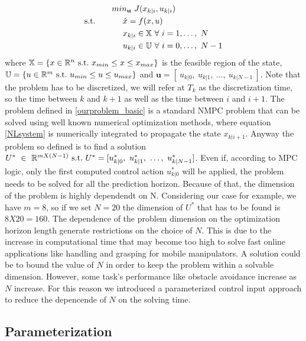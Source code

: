 \begin{equation} \label{ourproblem_basic}
\begin{split}
		& min_{\textbf{u}}\ J({x}_{k|i},{u}_{k|i}) \\
		\textnormal{s.t.}\qquad
		&\ \ \ \ \dot{{x}}=f({x},{u}) \\
		&\ \ \ \ {x}_{k|i} \in \mathbb{X}\ \forall\ i=1,\dots,\ N  \\
		&\ \ \ \ {u}_{k|i} \in \mathbb{U}\ \forall\ i=0,\dots,\ N-1 \\
	\end{split}	
\end{equation}
where $\mathbb{X} = \lbrace {x}\in \mathbb{R}^n\ \textnormal{s.t.}\ {x}_{min}\leq x\leq x_{max} \rbrace$ is the feasible region of the state, $\mathbb{U} = \lbrace {u}\in \mathbb{R}^m\ \textnormal{s.t.}\ {u}_{min}\leq{u}\leq{u}_{max} \rbrace $ and $\textbf{u}=[\ u_{k|0},\ u_{k|1},\ \dots,\ u_{k|N-1}\ ]$.
Note that the problem has to be discretized, we will refer at $T_k$ as the discretization time, so the time between $k$ and $k+1$ as well as the time between $i$ and $i+1$.
The problem defined in \ref{ourproblem_basic} is a standard NMPC problem that can be solved using well known numerical optimization methods, where equation \ref{NLsystem} is numerically integrated to propagate the state ${x}_{k|i+1}$. Anyway the problem so defined is to find a solution $U^*\ \in\ \mathbb{R}^{mX(N-1)}\ \textnormal{s.t.}\ U^* =[{u}^*_{k|0},\ {u}^*_{k|1},\ \dots,\ {u}^*_{k|N-1}]$. Even if, according to MPC logic, only the first computed control action ${u}^*_{k|0}$ will be applied, the problem needs to be solved for all the prediction horizon. Because of that, the dimension of the problem is highly dependendt on N. Considering our case for example, we have $m=8$, so if we set $N=20$ the dimension of $U^*$ that has to be found is $8X20=160$. The dependence of the problem dimension on the optimization horizon length generate restrictions on the choice of $N$. This is due to the increase in computational time that may become too high to solve fast online applications like handling and grasping for mobile manipulators. A solution could be to bound the value of $N$ in order to keep the problem within a solvable dimension. However, some task's performance like obstacle avoidance increase as $N$ increase. For this reason we introduced a parameterized control input approach to reduce the depencende of $N$ on the solving time.

\subsection{Parameterization}

